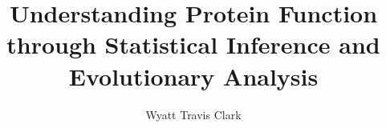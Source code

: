 \documentclass[final]{iuthesis}
\title{Understanding Protein Function through Statistical Inference and Evolutionary Analysis}
\author{Wyatt Travis Clark}
\begin{document}
	
	\frontmatter
	\maketitle

	\signaturepage
	
	
	\makededication
	
	
	\makeack


	\makeabstract

	\tableofcontents
	\listoffigures

	
	\mainmatter
	 
		
	
	
	
	
	
	\appendix 
%	

	 
	
%	
	\printindex
	
%	
\end{document}
